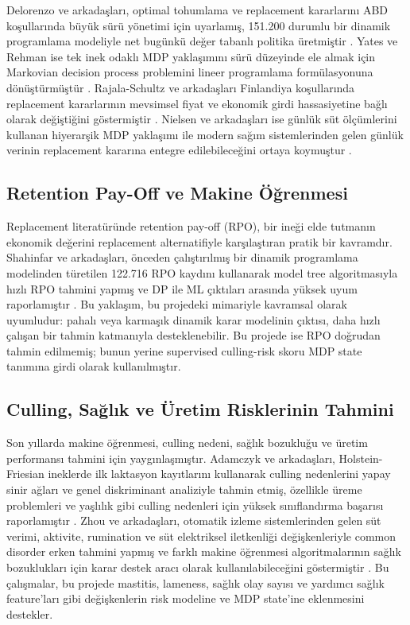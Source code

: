 \documentclass[conference]{IEEEtran}
\begin{document}
Delorenzo ve arkadaşları, optimal tohumlama ve replacement kararlarını ABD
koşullarında büyük sürü yönetimi için uyarlamış, 151.200 durumlu bir dinamik
programlama modeliyle net bugünkü değer tabanlı politika üretmiştir
\cite{delorenzo1992}. Yates ve Rehman ise tek inek odaklı MDP yaklaşımını sürü
düzeyinde ele almak için Markovian decision process problemini lineer programlama
formülasyonuna dönüştürmüştür \cite{yates1998}. Rajala-Schultz ve arkadaşları
Finlandiya koşullarında replacement kararlarının mevsimsel fiyat ve ekonomik
girdi hassasiyetine bağlı olarak değiştiğini göstermiştir \cite{rajala2000}.
Nielsen ve arkadaşları ise günlük süt ölçümlerini kullanan hiyerarşik MDP
yaklaşımı ile modern sağım sistemlerinden gelen günlük verinin replacement
kararına entegre edilebileceğini ortaya koymuştur \cite{nielsen2010}.

\subsection{Retention Pay-Off ve Makine Öğrenmesi}
Replacement literatüründe retention pay-off (RPO), bir ineği elde tutmanın
ekonomik değerini replacement alternatifiyle karşılaştıran pratik bir kavramdır.
Shahinfar ve arkadaşları, önceden çalıştırılmış bir dinamik programlama
modelinden türetilen 122.716 RPO kaydını kullanarak model tree algoritmasıyla
hızlı RPO tahmini yapmış ve DP ile ML çıktıları arasında yüksek uyum raporlamıştır
\cite{shahinfar2014}. Bu yaklaşım, bu projedeki mimariyle kavramsal olarak
uyumludur: pahalı veya karmaşık dinamik karar modelinin çıktısı, daha hızlı
çalışan bir tahmin katmanıyla desteklenebilir. Bu projede ise RPO doğrudan
tahmin edilmemiş; bunun yerine supervised culling-risk skoru MDP state
tanımına girdi olarak kullanılmıştır.

\subsection{Culling, Sağlık ve Üretim Risklerinin Tahmini}
Son yıllarda makine öğrenmesi, culling nedeni, sağlık bozukluğu ve üretim
performansı tahmini için yaygınlaşmıştır. Adamczyk ve arkadaşları,
Holstein-Friesian ineklerde ilk laktasyon kayıtlarını kullanarak culling
nedenlerini yapay sinir ağları ve genel diskriminant analiziyle tahmin etmiş,
özellikle üreme problemleri ve yaşlılık gibi culling nedenleri için yüksek
sınıflandırma başarısı raporlamıştır \cite{adamczyk2021}. Zhou ve arkadaşları,
otomatik izleme sistemlerinden gelen süt verimi, aktivite, rumination ve süt
elektriksel iletkenliği değişkenleriyle common disorder erken tahmini yapmış ve
farklı makine öğrenmesi algoritmalarının sağlık bozuklukları için karar destek
aracı olarak kullanılabileceğini göstermiştir \cite{zhou2022}. Bu çalışmalar,
bu projede mastitis, lameness, sağlık olay sayısı ve yardımcı sağlık feature'ları
gibi değişkenlerin risk modeline ve MDP state'ine eklenmesini destekler.
\end{document}
